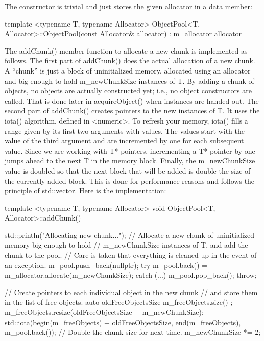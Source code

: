 The constructor is trivial and just stores the given allocator in a data member:

\begin{cpp}
template <typename T, typename Allocator>
ObjectPool<T, Allocator>::ObjectPool(const Allocator& allocator)
    : m_allocator { allocator }
{}
\end{cpp}

The addChunk() member function to allocate a new chunk is implemented as follows. The first part of addChunk() does the actual allocation of a new chunk. A “chunk” is just a block of uninitialized memory, allocated using an allocator and big enough to hold m\_newChunkSize instances of T. By adding a chunk of objects, no objects are actually constructed yet; i.e., no object constructors are called. That is done later in acquireObject() when instances are handed out. The second part of addChunk() creates pointers to the new instances of T. It uses the iota() algorithm, defined in <numeric>. To refresh your memory, iota() fills a range given by its first two arguments with values. The values start with the value of the third argument and are incremented by one for each subsequent value. Since we are working with T* pointers, incrementing a T* pointer by one jumps ahead to the next T in the memory block. Finally, the m\_newChunkSize value is doubled so that the next block that will be added is double the size of the currently added block. This is done for performance reasons and follows the principle of std::vector. Here is the implementation:

\begin{cpp}
template <typename T, typename Allocator>
void ObjectPool<T, Allocator>::addChunk()
{
    std::println("Allocating new chunk...");
    // Allocate a new chunk of uninitialized memory big enough to hold
    // m_newChunkSize instances of T, and add the chunk to the pool.
    // Care is taken that everything is cleaned up in the event of an exception.
    m_pool.push_back(nullptr);
    try {
        m_pool.back() = m_allocator.allocate(m_newChunkSize);
    } catch (...) {
        m_pool.pop_back();
        throw;
    }

    // Create pointers to each individual object in the new chunk
    // and store them in the list of free objects.
    auto oldFreeObjectsSize { m_freeObjects.size() };
    m_freeObjects.resize(oldFreeObjectsSize + m_newChunkSize);
    std::iota(begin(m_freeObjects) + oldFreeObjectsSize, end(m_freeObjects),
        m_pool.back());
    // Double the chunk size for next time.
    m_newChunkSize *= 2;
}
\end{cpp}

